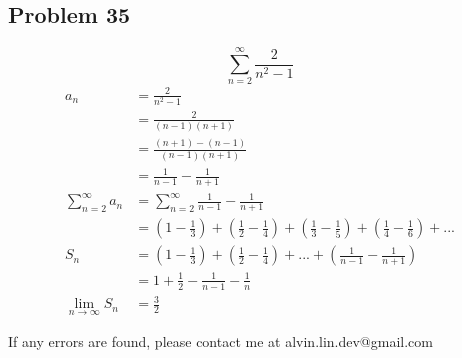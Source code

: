 \documentclass[letterpaper, 12pt]{article}
\begin{document}
\subsection*{Problem 35}
\[ \sum_{n=2}^{\infty}\frac{2}{n^{2}-1} \]
\begin{align*}
  a_{n} &= \frac{2}{n^{2}-1} \\
  &= \frac{2}{(n-1)(n+1)} \\
  &= \frac{(n+1)-(n-1)}{(n-1)(n+1)} \\
  &= \frac{1}{n-1}-\frac{1}{n+1} \\
  \sum_{n=2}^{\infty}a_{n} &= \sum_{n=2}^{\infty}\frac{1}{n-1}-\frac{1}{n+1} \\
  &= (1-\frac{1}{3})+(\frac{1}{2}-\frac{1}{4})+(\frac{1}{3}-\frac{1}{5})+
    (\frac{1}{4}-\frac{1}{6})+... \\
  S_{n} &= (1-\frac{1}{3})+(\frac{1}{2}-\frac{1}{4})+...+
    (\frac{1}{n-1}-\frac{1}{n+1}) \\
  &= 1+\frac{1}{2}-\frac{1}{n-1}-\frac{1}{n} \\
  \lim_{n\to\infty}S_{n} &= \frac{3}{2}
\end{align*}

\begin{center}
  If any errors are found, please contact me at alvin.lin.dev@gmail.com
\end{center}
\end{document}
